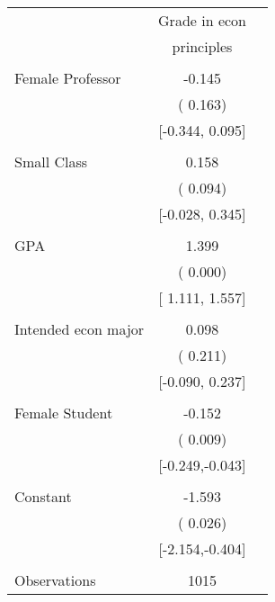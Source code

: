 \begin{tabular}{lcc} \toprule
& Grade in econ  \tabularnewline
& principles \tabularnewline \midrule
&  \tabularnewline
Female Professor & -0.145 \tabularnewline
& ( 0.163) &\tabularnewline
& {[}-0.344, 0.095{]} \tabularnewline
& \tabularnewline
Small Class &  0.158 \tabularnewline
& ( 0.094) \tabularnewline
& {[}-0.028, 0.345{]} \tabularnewline
&  \tabularnewline
GPA &  1.399 \tabularnewline
& ( 0.000) \tabularnewline
& {[} 1.111, 1.557{]} \tabularnewline
&  \tabularnewline
Intended econ major &  0.098 \tabularnewline
& ( 0.211) \tabularnewline
& {[}-0.090, 0.237{]} \tabularnewline
&  \tabularnewline
Female Student & -0.152 \tabularnewline
& ( 0.009) \tabularnewline
& {[}-0.249,-0.043{]} \tabularnewline
&  \tabularnewline
Constant  & -1.593 \tabularnewline
& ( 0.026) \tabularnewline
& {[}-2.154,-0.404{]} \tabularnewline
&  \tabularnewline
Observations & 1015 \tabularnewline
\bottomrule \bottomrule
\end{tabular}
